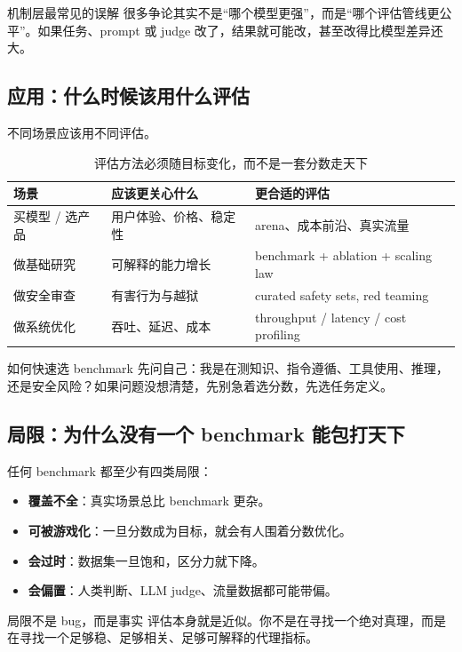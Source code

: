 \begin{warningbox}{机制层最常见的误解}
很多争论其实不是“哪个模型更强”，而是“哪个评估管线更公平”。如果任务、prompt 或 judge 改了，结果就可能改，甚至改得比模型差异还大。
\end{warningbox}

\subsection{应用：什么时候该用什么评估}

不同场景应该用不同评估。

\begin{table}[H]
\centering
\begin{tabular}{p{3.0cm}p{4.0cm}p{5.8cm}}
\toprule
\textbf{场景} & \textbf{应该更关心什么} & \textbf{更合适的评估} \\
\midrule
买模型 / 选产品 & 用户体验、价格、稳定性 & arena、成本前沿、真实流量 \\
做基础研究 & 可解释的能力增长 & benchmark + ablation + scaling law \\
做安全审查 & 有害行为与越狱 & curated safety sets, red teaming \\
做系统优化 & 吞吐、延迟、成本 & throughput / latency / cost profiling \\
\bottomrule
\end{tabular}
\caption{评估方法必须随目标变化，而不是一套分数走天下}
\end{table}

\begin{knowledgebox}{如何快速选 benchmark}
先问自己：我是在测知识、指令遵循、工具使用、推理，还是安全风险？如果问题没想清楚，先别急着选分数，先选任务定义。
\end{knowledgebox}

\subsection{局限：为什么没有一个 benchmark 能包打天下}

任何 benchmark 都至少有四类局限：
\begin{itemize}
    \item \textbf{覆盖不全}：真实场景总比 benchmark 更杂。
    \item \textbf{可被游戏化}：一旦分数成为目标，就会有人围着分数优化。
    \item \textbf{会过时}：数据集一旦饱和，区分力就下降。
    \item \textbf{会偏置}：人类判断、LLM judge、流量数据都可能带偏。
\end{itemize}

\begin{importantbox}{局限不是 bug，而是事实}
评估本身就是近似。你不是在寻找一个绝对真理，而是在寻找一个足够稳、足够相关、足够可解释的代理指标。
\end{importantbox}

